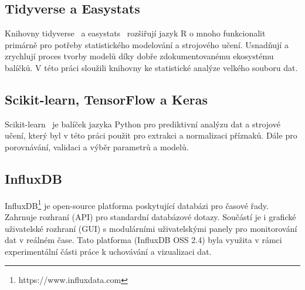 \subsection{Tidyverse a Easystats}
\label{subsec:tidyverse_easystats}
Knihovny tidyverse~\cite{tidyverse} a easystats~\cite{easystats} rozšiřují jazyk
R o mnoho funkcionalit primárně pro potřeby statistického modelování a
strojového učení. Usnadňují a zrychlují proces tvorby modelů díky dobře
zdokumentovanému ekosystému balíčků. V této práci sloužili knihovny ke
statistické analýze velkého souboru dat. 

\subsection{Scikit-learn, TensorFlow a Keras}
\label{subsec:scitkit_tensor_keras}
Scikit-learn~\cite{sklearn_api} je balíček jazyka Python pro prediktivní analýzu
dat a strojové učení, který byl v této práci použit pro extrakci a normalizaci
příznaků. Dále pro porovnávání, validaci a výběr parametrů a modelů.



\subsection{InfluxDB}
\label{subsec:influx}
InfluxDB\footnote{https://www.influxdata.com} je open-source platforma
poskytující databázi pro časové řady. Zahrnuje rozhraní (API) pro standardní
databázové dotazy. Součástí je i grafické uživatelské rozhraní (GUI) s
modulárními uživatelskými panely pro monitorování dat v reálném čase. Tato
platforma (InfluxDB OSS 2.4) byla využita v rámci experimentální části práce k
uchovávání a vizualizaci dat.

